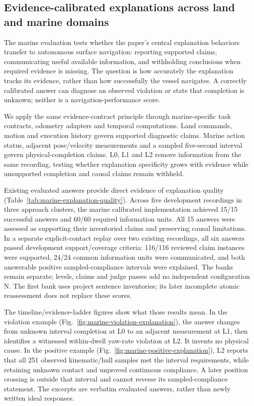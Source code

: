 \subsection{Evidence-calibrated explanations across land and marine domains}
\label{sec:marine-temporal-evidence}

The marine evaluation tests whether the paper's central explanation behaviors
transfer to autonomous surface navigation: reporting supported claims,
communicating useful available information, and withholding conclusions when
required evidence is missing. The question is how accurately the explanation
tracks its evidence, rather than how successfully the vessel navigates. A
correctly calibrated answer can diagnose an observed violation or state that
completion is unknown; neither is a navigation-performance score.

We apply the same evidence-contract principle through marine-specific task
contracts, odometry adapters and temporal computations. Land commands, motion
and execution history govern supported diagnostic claims. Marine action status,
adjacent pose/velocity measurements and a sampled five-second interval govern
physical-completion claims. L0, L1 and L2 remove information from the same
recording, testing whether explanation specificity grows with evidence while
unsupported completion and causal claims remain withheld.

Existing evaluated answers provide direct evidence of explanation quality
(Table~\ref{tab:marine-explanation-quality}). Across five development recordings
in three approach clusters, the marine calibrated implementation achieved
15/15 successful answers and 60/60 required information units. All 15 answers
were assessed as supporting their inventoried claims and preserving causal
limitations. In a separate explicit-contact replay over two existing recordings,
all six answers passed development support/coverage criteria: 116/116 reviewed
claim instances were supported, 24/24 common information units were communicated,
and both answerable positive sampled-compliance intervals were explained.
The banks remain separate; levels, claims and judge passes add no independent
configuration N. The first bank uses project sentence inventories; its later
incomplete atomic reassessment does not replace these scores.

The timeline/evidence-ladder figures show what those results mean. In the
violation example (Fig.~\ref{fig:marine-violation-explanation}), the answer changes
from unknown interval completion at L0 to an adjacent measurement at L1, then
identifies a witnessed within-dwell yaw-rate violation at L2. It invents no
physical cause. In the positive example (Fig.~\ref{fig:marine-positive-explanation}),
L2 reports that all 251 observed kinematic/hull samples met the interval
requirements, while retaining unknown contact and unproved continuous compliance.
A later position crossing is outside that interval and cannot reverse its
sampled-compliance statement. The excerpts are verbatim evaluated answers,
rather than newly written ideal responses.

